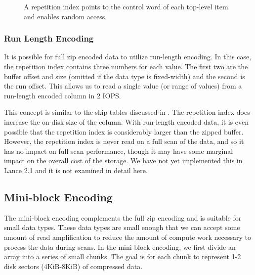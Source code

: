 \documentclass[sigconf, nonacm]{acmart}
\begin{document}
\begin{figure}
    \centering
    
    \caption{A repetition index points to the control word of each top-level item and enables random access.}
\end{figure}

\subsubsection{Run Length Encoding}

It is possible for full zip encoded data to utilize run-length encoding.  In this case, the repetition index contains three numbers for each value.  The first two are the buffer offset and size (omitted if the data type is fixed-width) and the second is the run offset.  This allows us to read a single value (or range of values) from a run-length encoded column in 2 IOPS.

This concept is similar to the skip tables discussed in \cite{Procella}.  The repetition index does increase the on-disk size of the column.  With run-length encoded data, it is even possible that the repetition index is considerably larger than the zipped buffer.  However, the repetition index is never read on a full scan of the data, and so it has no impact on full scan performance, though it may have some marginal impact on the overall cost of the storage.  We have not yet implemented this in Lance 2.1 and it is not examined in detail here.

\subsection{Mini-block Encoding}

The mini-block encoding complements the full zip encoding and is suitable for small data types.  These data types are small enough that we can accept some amount of read amplification to reduce the amount of compute work necessary to process the data during scans.  In the mini-block encoding, we first divide an array into a series of small chunks.  The goal is for each chunk to represent 1-2 disk sectors (4KiB-8KiB) of compressed data.
\end{document}
